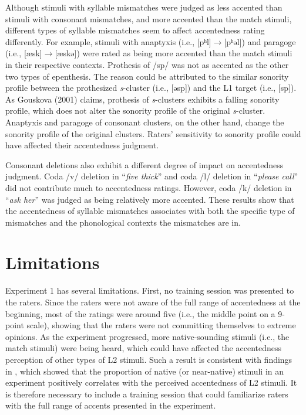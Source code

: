Although stimuli with syllable mismatches were judged as less accented than stimuli with consonant mismatches, and more accented than the match stimuli, different types of syllable mismatches seem to affect accentedness rating differently. For example, stimuli with anaptyxis (i.e., [pʰl]$\rightarrow$[pʰəl]) and paragoge (i.e., [æsk]$\rightarrow$[æskə]) were rated as being more accented than the match stimuli in their respective contexts. Prothesis of /sp/ was not as accented as the other two types of epenthesis. The reason could be attributed to the similar sonority profile between the prothesized \textit{s}-cluster (i.e., [əsp]) and the L1 target (i.e., [sp]). As Gouskova (2001) claims, prothesis of \textit{s}-clusters exhibits a falling sonority profile, which does not alter the sonority profile of the original \textit{s}-cluster. Anaptyxis and paragoge of consonant clusters, on the other hand, change the sonority profile of the original clusters. Raters’ sensitivity to sonority profile could have affected their accentedness judgment. 

Consonant deletions also exhibit a different degree of impact on accentedness judgment. Coda /v/ deletion in “\textit{five thick}” and coda /l/ deletion in “\textit{please call}” did not contribute much to accentedness ratings. However, coda /k/ deletion in “\textit{ask her}” was judged as being relatively more accented. These results show that the accentedness of syllable mismatches associates with both the specific type of mismatches and the phonological contexts the mismatches are in. 

\section{Limitations}

Experiment 1 has several limitations. First, no training session was presented to the raters. Since the raters were not aware of the full range of accentedness at the beginning, most of the ratings were around five (i.e., the middle point on a 9-point scale), showing that the raters were not committing themselves to extreme opinions. As the experiment progressed, more native-sounding stimuli (i.e., the match stimuli) were being heard, which could have affected the accentedness perception of other types of L2 stimuli. Such a result is consistent with findings in \citet{Flege_1992}, which showed that the proportion of native (or near-native) stimuli in an experiment positively correlates with the perceived accentedness of L2 stimuli. It is therefore necessary to include a training session that could familiarize raters with the full range of accents presented in the experiment. 

